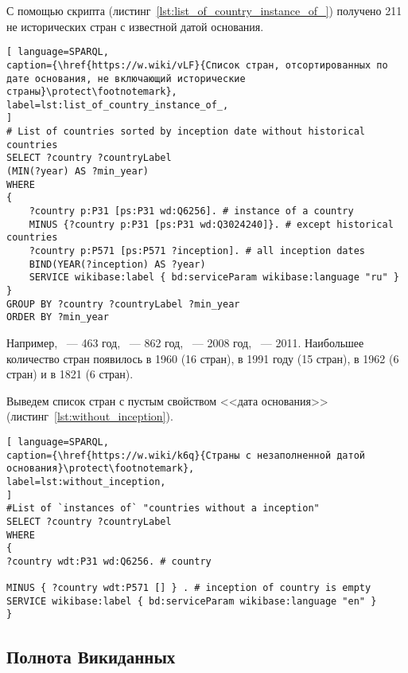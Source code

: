С помощью скрипта (листинг~\ref{lst:list_of_country_instance_of_}) получено 211 не исторических стран с известной датой основания.

\begin{lstlisting}[ language=SPARQL, 
caption={\href{https://w.wiki/vLF}{Список стран, отсортированных по дате основания, не включающий исторические страны}\protect\footnotemark},
label=lst:list_of_country_instance_of_, 
]
# List of countries sorted by inception date without historical countries
SELECT ?country ?countryLabel 
(MIN(?year) AS ?min_year)
WHERE
{
	?country p:P31 [ps:P31 wd:Q6256]. # instance of a country 
	MINUS {?country p:P31 [ps:P31 wd:Q3024240]}. # except historical countries
	?country p:P571 [ps:P571 ?inception]. # all inception dates
	BIND(YEAR(?inception) AS ?year)
	SERVICE wikibase:label { bd:serviceParam wikibase:language "ru" }
}
GROUP BY ?country ?countryLabel ?min_year
ORDER BY ?min_year
\end{lstlisting}


Например, ~--- 463 год, ~--- 862 год, ~--- 2008 год, ~--- 2011. 
Наибольшее количество стран появилось в 1960 (16 стран), в 1991 году (15 стран), в 1962 (6 стран) и в 1821 (6 стран).

Выведем список стран с пустым свойством <<дата основания>> (листинг~\ref{lst:without_inception}).

\begin{lstlisting}[ language=SPARQL, 
caption={\href{https://w.wiki/k6q}{Страны с незаполненной датой основания}\protect\footnotemark},
label=lst:without_inception, 
]
#List of `instances of` "countries without a inception" 
SELECT ?country ?countryLabel 
WHERE
{
?country wdt:P31 wd:Q6256. # country

MINUS { ?country wdt:P571 [] } . # inception of country is empty
SERVICE wikibase:label { bd:serviceParam wikibase:language "en" }
}
\end{lstlisting}


\subsection{Полнота Викиданных}

